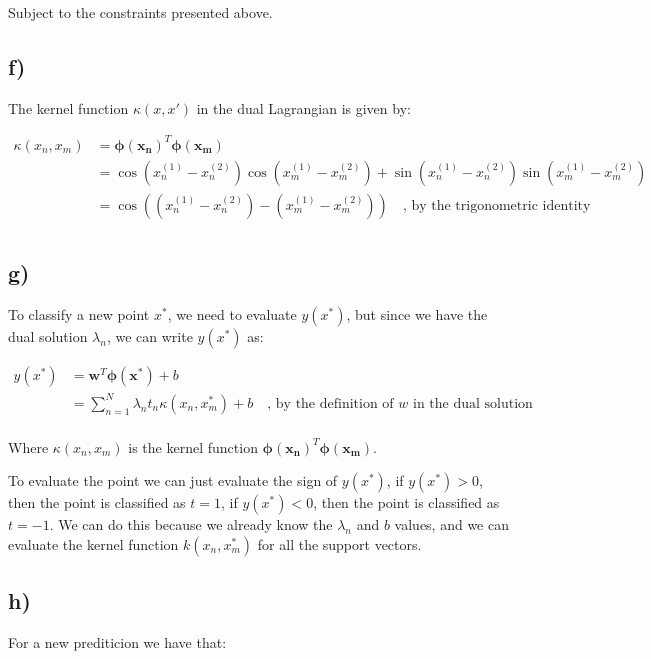 \documentclass[12pt,a4paper,oneside]{paper}
\begin{document}
Subject to the constraints presented above.

\newpage
\subsection*{f)}

The kernel function $\kappa (x, x')$ in the dual Lagrangian is given by:

\begin{align*}
    \kappa (x_n, x_m) &= \bm{\phi(x_n)}^T \bm{\phi(x_m)} \\
    &= \cos(x_n^{(1)} - x_n^{(2)}) \cos(x_m^{(1)} - x_m^{(2)}) + \sin(x_n^{(1)} - x_n^{(2)}) \sin(x_m^{(1)} - x_m^{(2)}) \\
    &= \cos((x_n^{(1)} - x_n^{(2)}) - (x_m^{(1)} - x_m^{(2)})) \quad \text{, by the trigonometric identity} \\
\end{align*}

\newpage
\subsection*{g)}

To classify a new point $x^\ast$, we need to evaluate $y(x^\ast)$, but since we have the dual solution $\lambda_n$, we can write $y(x^\ast)$ as:

\begin{align*}
    y(x^\ast) &= \bm{w}^T \bm{\phi(x^\ast)} + b \\
    &= \sum_{n=1}^{N} \lambda_n t_n \kappa (x_n, x^\ast_m) + b \quad \text{, by the definition of $w$ in the dual solution} \\
\end{align*}

Where $\kappa (x_n, x_m)$ is the kernel function $\bm{\phi(x_n)}^T \bm{\phi(x_m)}$.

To evaluate the point we can just evaluate the sign of $y(x^\ast)$, if $y(x^\ast) > 0$, then the point is classified as $t = 1$, if $y(x^\ast) < 0$, then the point is classified as $t = -1$.
We can do this because we already know the $\lambda_n$ and $b$ values, and we can evaluate the kernel function $k(x_n, x^\ast_m)$ for all the support vectors.

\newpage
\subsection*{h)}

For a new prediticion we have that:
\end{document}
